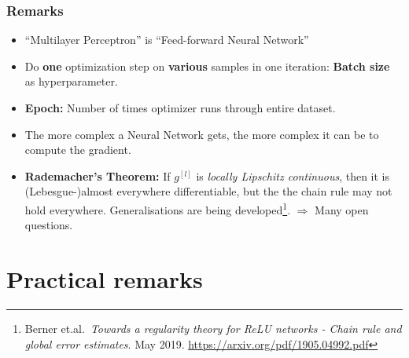 \documentclass[10pt,hyperref={pdfpagelabels=false}]{beamer}
\begin{document}
\begin{frame}
    \frametitle{Remarks}
    \begin{itemize}
        \item ``Multilayer Perceptron'' is ``Feed-forward Neural Network''
        \item Do {\bf one} optimization step on {\bf various} samples in one iteration: {\bf Batch size} as hyperparameter.
        \item {\bf Epoch:} Number of times optimizer runs through entire dataset.
        \item The more complex a Neural Network gets, the more complex it can be to compute the gradient.
        \item {\bf Rademacher's Theorem:} If $g^{[l]}$ is \emph{locally Lipschitz continuous}, then it is (Lebesgue-)almost everywhere differentiable, but the the chain rule may not hold everywhere. Generalisations are being developed\footnote{Berner et.al.~\emph{Towards a regularity theory for ReLU networks - Chain rule and global error estimates}. May 2019. \url{https://arxiv.org/pdf/1905.04992.pdf}}.
        \hfill $\Rightarrow$ Many open questions.
    \end{itemize}
\end{frame}
\section{Practical remarks}
\end{document}
